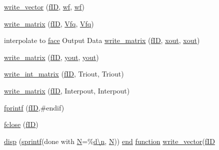 \begin{DoxyCompactItemize}
\item 
\hyperlink{a00473_a440aca7095ed6ac602d8b22d073c8ea1}{write\+\_\+vector} (\hyperlink{a00473_ae0527cbfd56392d5095a691bbf10ba5b}{f\+ID}, \hyperlink{a00473_a7bb9d681a4df47c616b79d82759cd0e6}{wf}, \textquotesingle{}\hyperlink{a00473_a7bb9d681a4df47c616b79d82759cd0e6}{wf}\textquotesingle{})
\item 
\hyperlink{a00473_af2772e6d0019ffff1bf440639d17973e}{write\+\_\+matrix} (\hyperlink{a00473_ae0527cbfd56392d5095a691bbf10ba5b}{f\+ID}, \hyperlink{a01014_ad06233c3cbd809b83fb292471e66fc78}{Vfq}, \textquotesingle{}\hyperlink{a01014_ad06233c3cbd809b83fb292471e66fc78}{Vfq}\textquotesingle{})
\item 
interpolate to \hyperlink{a00611_ac4ec0037ba529da25bf084669a45f60c}{face} Output Data \hyperlink{a00473_a32c9d67ce55e7858a1ba2291b2898bc4}{write\+\_\+matrix} (\hyperlink{a00473_ae0527cbfd56392d5095a691bbf10ba5b}{f\+ID}, \hyperlink{a00563_aa43b7c30923e8fcf939fe12082a19359}{xout}, \textquotesingle{}\hyperlink{a00563_aa43b7c30923e8fcf939fe12082a19359}{xout}\textquotesingle{})
\item 
\hyperlink{a00473_a93bcb19dec37a557bc6b7feb115833c4}{write\+\_\+matrix} (\hyperlink{a00473_ae0527cbfd56392d5095a691bbf10ba5b}{f\+ID}, \hyperlink{a00563_a440aa7a05dec25dc6fe586eaa162395b}{yout}, \textquotesingle{}\hyperlink{a00563_a440aa7a05dec25dc6fe586eaa162395b}{yout}\textquotesingle{})
\item 
\hyperlink{a00473_aba4b4623e6db21e03b1f72fc7537e647}{write\+\_\+int\+\_\+matrix} (\hyperlink{a00473_ae0527cbfd56392d5095a691bbf10ba5b}{f\+ID}, Triout, \textquotesingle{}Triout\textquotesingle{})
\item 
\hyperlink{a00473_a9fe9cf0c49c7ea4fd2c704cd134715f4}{write\+\_\+matrix} (\hyperlink{a00473_ae0527cbfd56392d5095a691bbf10ba5b}{f\+ID}, Interpout, \textquotesingle{}Interpout\textquotesingle{})
\item 
\hyperlink{a00473_a206264bfbe00bdb5d1b0daee718ae846}{fprintf} (\hyperlink{a00473_ae0527cbfd56392d5095a691bbf10ba5b}{f\+ID},\textquotesingle{}\#endif\textquotesingle{})
\item 
\hyperlink{a00473_a355ed4cdac2a27aa04a6689ac2d7e86e}{fclose} (\hyperlink{a00473_ae0527cbfd56392d5095a691bbf10ba5b}{f\+ID})
\item 
\hyperlink{a00473_a7b5a959e1fa05b85090f4f729b0f9784}{disp} (\hyperlink{a00575_ae6aab5c308faac0fc539cc9c6da9fbd0}{sprintf}(\textquotesingle{}done with \hyperlink{a00473_a5b9c4563028063ee53b517cce9aa701b}{N}=\%\hyperlink{a00623_a781a04ab095280f838ff3eb0e51312e0}{d\textbackslash{}n}\textquotesingle{}, \hyperlink{a00473_a5b9c4563028063ee53b517cce9aa701b}{N})) \hyperlink{a00608_afb358f48b1646c750fb9da6c6585be2b}{end} \hyperlink{a00611_a2420833d971716e9bab41cc9fb3abba1}{function} \hyperlink{a00473_a440aca7095ed6ac602d8b22d073c8ea1}{write\+\_\+vector}(\hyperlink{a00473_ae0527cbfd56392d5095a691bbf10ba5b}{f\+ID}

\end{DoxyCompactItemize}
